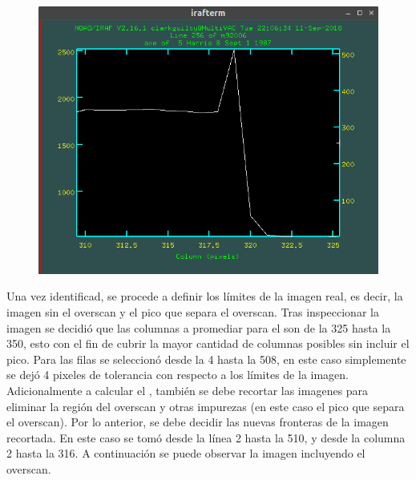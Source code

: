 \documentclass[12pt]{article}
\begin{document}
\begin{figure}[H]
  \centering
   \includegraphics[scale= 0.5]{im01.png}
  \label{im01}
\end{figure}



Una vez identificad, se procede a definir los límites de la imagen real, es decir, la imagen sin el overscan y el pico que separa el overscan. Tras inspeccionar la imagen se decidió que las columnas a promediar para el  son de la 325 hasta la 350, esto con el fin de cubrir la mayor cantidad de columnas posibles sin incluir el pico. Para las filas se seleccionó desde la 4 hasta la 508, en este caso simplemente se dejó 4 pixeles de tolerancia con respecto a los límites de la imagen.\\

Adicionalmente a calcular el , también se debe recortar las imagenes para eliminar la región del overscan y otras impurezas (en este caso el pico que separa el overscan). Por lo anterior, se debe decidir las nuevas fronteras de la imagen recortada. En este caso se tomó desde la línea 2 hasta la 510, y desde la columna 2 hasta la 316. A continuación se puede observar la imagen incluyendo el overscan.
\end{document}
